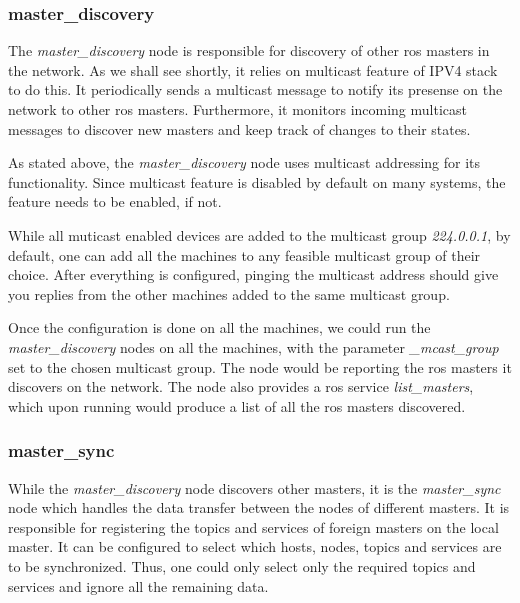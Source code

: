\subsubsection{master\_discovery}
The \textit{master\_discovery} node is responsible for discovery of other ros masters in the network. As we shall see shortly, it relies on multicast feature of IPV4 stack to do this. It periodically sends a multicast message to notify its presense on the network to other ros masters. Furthermore, it monitors incoming multicast messages to discover new masters and keep track of changes to their states.

As stated above, the \textit{master\_discovery} node uses multicast addressing for its functionality. Since multicast feature is disabled by default on many systems, the feature needs to be enabled, if not.

While all muticast enabled devices are added to the multicast group \textit{224.0.0.1}, by default, one can add all the machines to any feasible multicast group of their choice. After everything is configured, pinging the multicast address should give you replies from the other machines added to the same multicast group.

Once the configuration is done on all the machines, we could run the \textit{master\_discovery} nodes on all the machines, with the parameter \textit{\_mcast\_group} set to the chosen multicast group. The node would be reporting the ros masters it discovers on the network. The node also provides a ros service \textit{list\_masters}, which upon running would produce a list of all the ros masters discovered.

\subsubsection{master\_sync}
While the \textit{master\_discovery} node discovers other masters, it is the \textit{master\_sync} node which handles the data transfer between the nodes of different masters. It is responsible for registering the topics and services of foreign masters on the local master. It can be configured to select which hosts, nodes, topics and services are to be synchronized. Thus, one could only select only the required topics and services and ignore all the remaining data.


